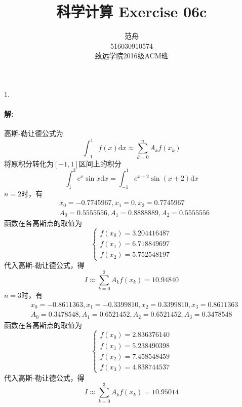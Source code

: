 \documentclass[12pt, a4paper]{article}
\title{科学计算 Exercise 06c}
\author{范舟\\516030910574\\致远学院2016级ACM班}
\date{}
\theoremstyle{margin}
\newcommand{\rd}{\mathrm{d}}
\begin{document}
\maketitle

1. \paragraph{解:} 高斯-勒让德公式为
\[\int_{-1}^{1} f(x) \rd x \approx \sum_{k = 0}^{n} A_k f(x_k)\]
将原积分转化为$[-1, 1]$区间上的积分
\[\int_{1}^{3} e^x \sin{x} \rd x = \int_{-1}^{1} e^{x + 2} \sin{(x + 2)} \rd x\]
$n = 2$时，有
\[\begin{split}
& x_0 = -0.7745967, x_1 = 0, x_2 = 0.7745967 \\
& A_0 = 0.5555556, A_1 = 0.8888889, A_2 = 0.5555556
\end{split}\]
函数在各高斯点的取值为
\[\begin{cases}
f(x_0) = 3.204416487 \\
f(x_1) = 6.718849697 \\
f(x_2) = 5.752548197
\end{cases}\]
代入高斯-勒让德公式，得
\[I \approx \sum_{k = 0}^{2} A_k f(x_k) = 10.94840\]
$n = 3$时，有
\[\begin{split}
& x_0 = -0.8611363, x_1 = -0.3399810, x_2 = 0.3399810, x_3 = 0.8611363 \\
& A_0 = 0.3478548, A_1 = 0.6521452, A_2 = 0.6521452, A_3 = 0.3478548
\end{split}\]
函数在各高斯点的取值为
\[\begin{cases}
f(x_0) = 2.836376140 \\
f(x_1) = 5.238490398 \\
f(x_2) = 7.458548459 \\
f(x_3) = 4.838744537
\end{cases}\]
代入高斯-勒让德公式，得
\[I \approx \sum_{k = 0}^{3} A_k f(x_k) = 10.95014\]
\newline 
\end{document}
